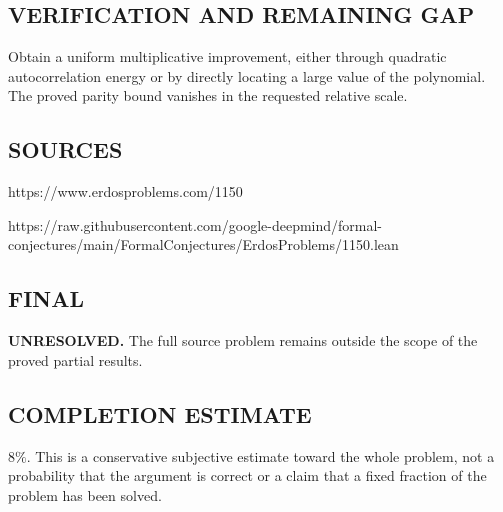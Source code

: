 \subsection*{VERIFICATION AND REMAINING GAP}
Obtain a uniform multiplicative improvement, either through quadratic
autocorrelation energy or by directly locating a large value of the polynomial.
The proved parity bound vanishes in the requested relative scale.

\subsection*{SOURCES}
https://www.erdosproblems.com/1150

https://raw.githubusercontent.com/google-deepmind/formal-conjectures/main/FormalConjectures/ErdosProblems/1150.lean

\subsection*{FINAL}
\textbf{UNRESOLVED.} The full source problem remains outside the scope of the proved partial results.

\subsection*{COMPLETION ESTIMATE}
$8\%$. This is a conservative subjective estimate toward the whole problem, not a probability that the argument is correct or a claim that a fixed fraction of the problem has been solved.
